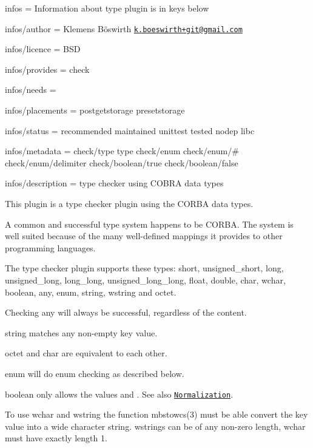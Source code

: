 
\begin{DoxyItemize}
\item infos = Information about type plugin is in keys below
\item infos/author = Klemens Böswirth \href{mailto:k.boeswirth+git@gmail.com}{\tt k.\+boeswirth+git@gmail.\+com}
\item infos/licence = B\+SD
\item infos/provides = check
\item infos/needs =
\item infos/placements = postgetstorage presetstorage
\item infos/status = recommended maintained unittest tested nodep libc
\item infos/metadata = check/type type check/enum check/enum/\# check/enum/delimiter check/boolean/true check/boolean/false
\item infos/description = type checker using C\+O\+B\+RA data types
\end{DoxyItemize}

This plugin is a type checker plugin using the {\ttfamily C\+O\+R\+BA} data types.

A common and successful type system happens to be C\+O\+R\+BA. The system is well suited because of the many well-\/defined mappings it provides to other programming languages.

The type checker plugin supports these types\+: {\ttfamily short}, {\ttfamily unsigned\+\_\+short}, {\ttfamily long}, {\ttfamily unsigned\+\_\+long}, {\ttfamily long\+\_\+long}, {\ttfamily unsigned\+\_\+long\+\_\+long}, {\ttfamily float}, {\ttfamily double}, {\ttfamily char}, {\ttfamily wchar}, {\ttfamily boolean}, {\ttfamily any}, {\ttfamily enum}, {\ttfamily string}, {\ttfamily wstring} and {\ttfamily octet}.


\begin{DoxyItemize}
\item Checking {\ttfamily any} will always be successful, regardless of the content.
\item {\ttfamily string} matches any non-\/empty key value.
\item {\ttfamily octet} and {\ttfamily char} are equivalent to each other.
\item {\ttfamily enum} will do enum checking as described below.
\item {\ttfamily boolean} only allows the values {} and {}. See also \href{#normalization}{\tt Normalization}.
\item To use {\ttfamily wchar} and {\ttfamily wstring} the function {\ttfamily mbstowcs(3)} must be able convert the key value into a wide character string. {\ttfamily wstring}s can be of any non-\/zero length, {\ttfamily wchar} must have exactly length 1.
\end{DoxyItemize}

